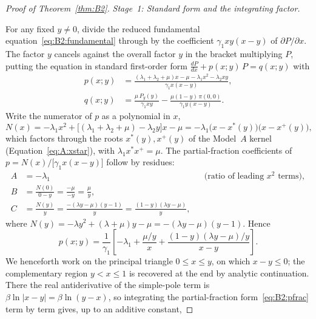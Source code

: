 \begin{proof}[Proof of Theorem~\ref{thm:B2}]

\noindent\textit{Stage~1: Standard form and the integrating factor.}
\medskip

For any fixed $y\neq0$, divide the reduced fundamental
equation~\eqref{eq:B2:fundamental} through by the coefficient $\gamma_1 xy(x-y)$ of
$\partial P/\partial x$. The factor $y$ cancels against the overall factor $y$ in the
bracket multiplying $P$, putting the equation in standard first-order form
$\tfrac{dP}{dx}+p(x;y)\,P=q(x;y)$ with
\begin{align}
    p(x;y) &= \frac{(\lambda_1+\lambda_2+\mu)x - \mu - \lambda_1 x^2 - \lambda_2 xy}
                   {\gamma_1 x(x-y)},
    \label{eq:B2:pxy}\\[4pt]
    q(x;y) &= \frac{\mu\,P_y(y)}{\gamma_1 xy}
             - \frac{\mu(1-y)\,\pi(0,0)}{\gamma_1 y(x-y)}.
    \label{eq:B2:qxy}
\end{align}
Write the numerator of $p$ as a polynomial in $x$,
\[
    N(x) = -\lambda_1 x^2 + \bigl[(\lambda_1+\lambda_2+\mu)-\lambda_2 y\bigr]x - \mu
         = -\lambda_1\bigl(x-x^*(y)\bigr)\bigl(x-x^+(y)\bigr),
\]
which factors through the roots $x^*(y),x^+(y)$ of the Model~$A$ kernel
(Equation~\eqref{eq:A:xstar}), with $\lambda_1 x^* x^+ = \mu$. The partial-fraction
coefficients of $p = N(x)/\bigl[\gamma_1 x(x-y)\bigr]$ follow by residues:
\begin{align}
    A &= -\lambda_1 && \text{(ratio of leading $x^2$ terms)}, \nonumber\\
    B &= \frac{N(0)}{0-y} = \frac{-\mu}{-y} = \frac{\mu}{y}, \nonumber\\
    C &= \frac{N(y)}{y} = \frac{-(\lambda y-\mu)(y-1)}{y}
       = \frac{(1-y)(\lambda y-\mu)}{y},
    \label{eq:B2:pfrac_coeffs}
\end{align}
where $N(y)=-\lambda y^2+(\lambda+\mu)y-\mu=-(\lambda y-\mu)(y-1)$. Hence
\begin{equation}
    p(x;y) = \frac{1}{\gamma_1}\!\left[
        -\lambda_1 + \frac{\mu/y}{x} + \frac{(1-y)(\lambda y-\mu)/y}{x-y}
    \right].
    \label{eq:B2:pfrac}
\end{equation}
We henceforth work on the principal triangle $0\le x\le y$, on which $x-y\le0$; the
complementary region $y<x\le1$ is recovered at the end by analytic continuation. There the
real antiderivative of the simple-pole term is $\beta\ln|x-y|=\beta\ln(y-x)$, so integrating
the partial-fraction form~\eqref{eq:B2:pfrac} term by term gives, up to an additive constant,

\end{proof}
